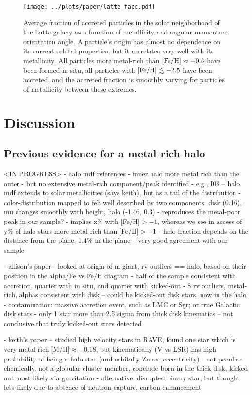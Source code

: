 \documentclass[apj, twocolappendix, numberedappendix, appendixfloats]{emulateapj}
\begin{document}
\begin{figure}
\begin{center}
\texttt{[image: ../plots/paper/latte\_facc.pdf]}
\caption{Average fraction of accreted particles in the solar neighborhood of the Latte galaxy as a function of metallicity and angular momentum orientation angle.
A particle's origin has almost no dependence on its current orbital properties, but it correlates very well with its metallicity.
All particles more metal-rich than $\rm[Fe/H]\approx-0.5$ have been formed in situ, all particles with $\rm[Fe/H]\lesssim-2.5$ have been accreted, and the accreted fraction is smoothly varying for particles of metallicity between these extremes.}
\label{fig:facc}
\end{center}
\end{figure}

\section{Discussion}

\subsection{Previous evidence for a metal-rich halo}
<IN PROGRESS>
- halo mdf references
- inner halo more metal rich than the outer
- but no extensive metal-rich component/peak identified
- e.g., I08 -- halo mdf extends to solar metallicities (says keith), but as a tail of the distribution
- color-distribution mapped to feh well described by two components: disk (0.16), mu changes smoothly with height, halo (-1.46, 0.3)
- reproduces the metal-poor peak in our sample?
- implies x\% with [Fe/H]$>-1$, whereas we see in access of y\% of halo stars more metal rich than [Fe/H]$>-1$
- halo fraction depends on the distance from the plane, 1.4\% in the plane -- very good agreement with our sample

- allison's paper
- looked at origin of m giant, rv outliers == halo, based on their position in the alpha/Fe vs Fe/H diagram
- half of the sample consistent with accretion, quarter with in situ, and quarter with kicked-out
- 8 rv outliers, metal-rich, alphas consistent with disk -- could be kicked-out disk stars, now in the halo
- contamination: massive accretion event, such as LMC or Sgr; or true Galactic disk stars
- only 1 star more than 2.5 sigma from thick disk kinematics -- not conclusive that truly kicked-out stars detected

- keith's paper -- studied high velocity stars in RAVE, found one star which is very metal rich [M/H]$\approx-0.18$, but kinematically (V vs LSR) has high probability of being a halo star (and orbitally Zmax, eccentricity)
- not peculiar chemically, not a globular cluster member, conclude born in the thick disk, kicked out most likely via gravitation
- alternative: disrupted binary star, but thought less likely due to absence of neutron capture, carbon enhancement
\end{document}
